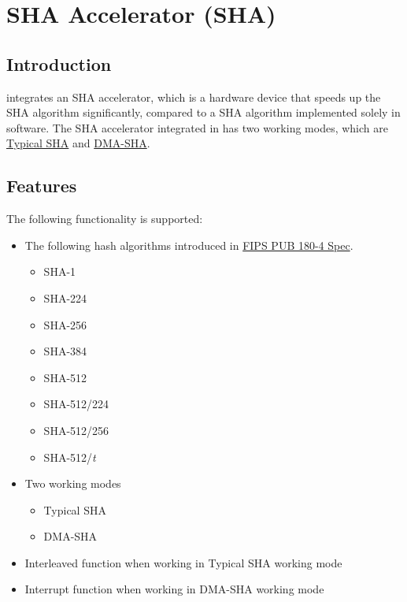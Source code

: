 \documentclass[main\_\_EN.tex]{subfiles}
\begin{document}

\ifglobal
\else
    \listoftodos
    {\let\clearpage\relax \listofdonetodos}
    \tableofcontents
\fi



\hypertarget{sha}{}
\chapter{SHA Accelerator (SHA)}
\label{mod:sha}
\section{Introduction}

\chipname{} integrates an SHA accelerator, which is a hardware device that speeds up the SHA algorithm significantly, compared to a SHA algorithm implemented solely in software. The SHA accelerator integrated in \chipname{} has two working modes, which are  \hyperref[sec:sha-typical-sha]{Typical SHA} and  \hyperref[sec:sha-dma-sha]{DMA-SHA}.

\section{Features}

The following functionality is supported:

\begin{itemize}
    \item The following hash algorithms introduced in   \href{https://doi.org/10.6028/NIST.FIPS.180-4}{FIPS PUB 180-4 Spec}.
    \begin{itemize}
        \item SHA-1
        \item SHA-224
        \item SHA-256
        \item SHA-384
        \item SHA-512
        \item SHA-512/224
        \item SHA-512/256
        \item SHA-512/{\it{t}}
    \end{itemize}
    \item Two working modes
    \begin{itemize}
        \item Typical SHA
        \item DMA-SHA
    \end{itemize}
    \item Interleaved function when working in Typical SHA working mode
    \item Interrupt function when working in DMA-SHA working mode
\end{itemize}
\end{document}
